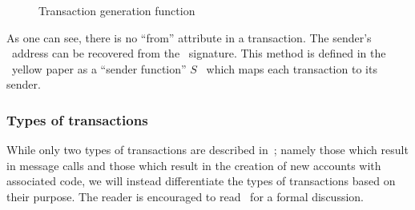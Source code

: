 \begin{figure}[H]
    \centering
    \caption{Transaction generation function \txgen}\label{preliminaries:fig:txgen}
\end{figure}

\begin{remark}\label{preliminaries:recovering-msg-sender}
    As one can see, there is no ``from'' attribute in a transaction. The sender's \ethereum~address can be recovered from the \ecdsa~signature. This method is defined in the \ethereum~yellow paper as a ``sender function'' $S$~\cite[Appendix F]{ethyellowpaper} which maps each transaction to its sender.
\end{remark}

\subsubsection{Types of transactions}\label{preliminaries:ethereum:eth-tx:tx-types}

While only two types of transactions are described in~\cite[Section 4.2]{ethyellowpaper}; namely those which result in message calls and those which result in the creation of new accounts with associated code, we will instead differentiate the types of transactions based on their purpose. The reader is encouraged to read~\cite{ethyellowpaper} for a formal discussion.

\medskip

